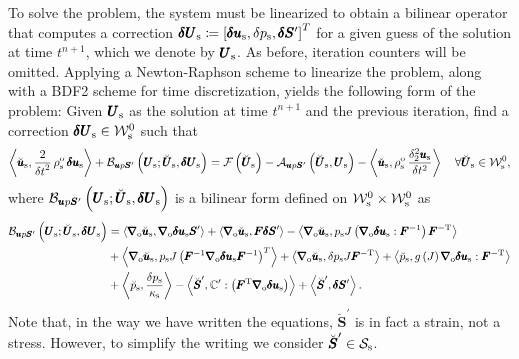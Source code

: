 \documentclass[11pt,english]{article}
\def\usolid{\pmb{u}_{\rm{s}}}                   %
\def\psolid{p_{\rm{s}}}                         %
\def\devPK{\pmb{S}^\prime}                      %
\def\unknosolid{\pmb{U}_{\rm{s}}}               %
\def\devPKspace{\mathcal{S}_{\rm{s}}}           %
\def\testusolid{\breve{\pmb{u}}_{\rm{s}}}       %
\def\testpsolid{\breve{p}_{\rm{s}}}             %
\def\testdevPK{\breve{\pmb{S}}^\prime}          %
\def\testsolid{\breve{\pmb{U}}_{\rm{s}}}        %
\def\testsolidspace{\mathcal{W}_{\rm{s}}^0}     %
\def\usolidinc{\pmb{\delta u}_{\rm{s}}}                   %
\def\psolidinc{\delta p_{\rm{s}}}                         %
\def\devPKinc{\pmb{\delta S}^\prime}                      %
\def\unknosolidinc{\pmb{\delta U}_{\rm{s}}}               %
\def\F{\pmb{F}}                             %
\def\Ftrans{\pmb{F}^{\rm{T}}}               %
\def\invF{\pmb{F}^{-1}}                     %
\def\invFtrans{\pmb{F}^{-\rm{T}}}           %
\def\grad{\pmb{\nabla}_{\rm{o}}}        %
\def\denssolid{\rho_{\rm{s}}^{\rm{o}}}  %
\def\kappasolid{\kappa_{\rm{s}}}        %
\def\ups{\pmb{u} p \devPK}
\def\dt{{\delta t}}                                     %
\def\BDFdudt2{\frac{\delta_2^2 \usolid}{\delta t^2}}    %
\begin{document}
To solve the problem, the system must be linearized to obtain a bilinear operator that computes a correction $\unknosolidinc \coloneqq \left [ \usolidinc, \psolidinc, \devPKinc \right ]^T$ for a given guess of the solution at time $t^{n+1}$, which we denote by $\unknosolid$. As before, iteration counters will be omitted. Applying a Newton-Raphson scheme to linearize the problem, along with a BDF2 scheme for time discretization, yields the following form of the problem: Given $\unknosolid$ as the solution at time $t^{n+1}$ and  the previous iteration, find a correction $\unknosolidinc \in \testsolidspace$ such that
\begin{equation*}
    \left \langle \testusolid , \frac{2}{\dt^2}\, \denssolid \, \usolidinc \right \rangle + \mathcal{B}_{\ups} \left ( \unknosolid; \testsolid, \unknosolidinc \right) = \mathcal{F} \left ( \testsolid  \right) -  \mathcal{A}_{\ups} \left ( \testsolid , \unknosolid \right) - \left \langle \testusolid, \denssolid \, \BDFdudt2 \right \rangle \quad \forall \testsolid \in \testsolidspace,
\end{equation*}
where $\mathcal{B}_{\ups} \left ( \unknosolid; \testsolid, \unknosolidinc \right)$ is a bilinear form defined on $\testsolidspace \times \testsolidspace$ as
\begin{alignat*}{1}
    \mathcal{B}_{\ups} \left ( \unknosolid; \testsolid, \unknosolidinc \right) 
    &= \left \langle \grad \testusolid , \grad \usolidinc \devPK \right \rangle 
    + \left \langle \grad \testusolid , \F \devPKinc \right \rangle 
    - \left \langle \grad \testusolid , \psolid J \left ( \grad \usolidinc : \invF \right ) \invFtrans \right \rangle \nonumber \\
    &+ \left \langle \grad \testusolid , \psolid J \left ( \invF \grad \usolidinc \invF \right )^T \right \rangle 
    + \left \langle \grad \testusolid ,  \psolidinc J \invFtrans \right \rangle 
    + \left \langle \testpsolid , g \left(J \right) \grad \usolidinc : \invFtrans \right \rangle \nonumber \\
    &+ \left \langle \testpsolid , \frac{\psolidinc}{\kappasolid} \right \rangle
    - \left \langle \testdevPK, \mathbb{C}^\prime : \left ( \Ftrans \grad \usolidinc  \right ) \right \rangle 
    + \left \langle \testdevPK , \devPKinc \right \rangle \nonumber .
\end{alignat*}
Note that, in the way we have written the equations, $\testdevPK$ is in fact a strain, not a stress. However, to simplify the writing we consider $\testdevPK\in \devPKspace$.
\end{document}
